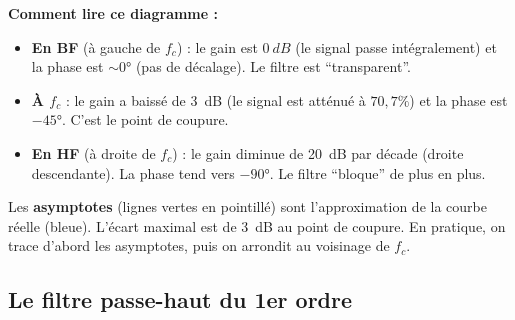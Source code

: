 \documentclass[12pt,a4paper,twoside]{book}
\begin{document}
\begin{center}
\end{center}

\begin{intuition}
\textbf{Comment lire ce diagramme :}
\begin{itemize}[nosep]
\item \textbf{En BF} (à gauche de $f_c$) : le gain est $\SI{0}{dB}$ (le signal passe intégralement) et la phase est $\sim 0°$ (pas de décalage). Le filtre est ``transparent''.
\item \textbf{À $f_c$} : le gain a baissé de \SI{3}{dB} (le signal est atténué à $70{,}7\%$) et la phase est $-45°$. C'est le point de coupure.
\item \textbf{En HF} (à droite de $f_c$) : le gain diminue de \SI{20}{dB} par décade (droite descendante). La phase tend vers $-90°$. Le filtre ``bloque'' de plus en plus.
\end{itemize}
Les \textbf{asymptotes} (lignes vertes en pointillé) sont l'approximation de la courbe réelle (bleue). L'écart maximal est de \SI{3}{dB} au point de coupure. En pratique, on trace d'abord les asymptotes, puis on arrondit au voisinage de $f_c$.
\end{intuition}

\subsection{Le filtre passe-haut du 1er ordre}
\end{document}
